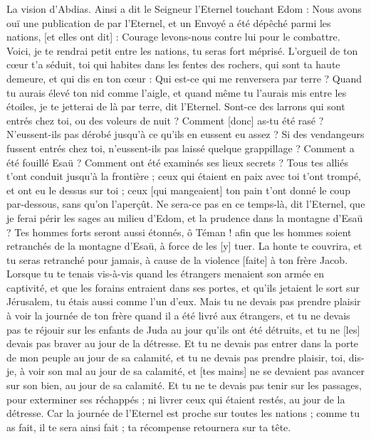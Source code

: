 \BFont
\begin{multicols}{2}
\VerseOne{}La vision d'Abdias. Ainsi a dit le Seigneur l'Eternel touchant Edom : Nous avons ouï une publication de par l'Eternel, et un Envoyé a été dépêché parmi les nations, [et elles ont dit] : Courage levons-nous contre lui pour le combattre.
Voici, je te rendrai petit entre les nations, tu seras fort méprisé.
L'orgueil de ton cœur t'a séduit, toi qui habites dans les fentes des rochers, qui sont ta haute demeure, et qui dis en ton cœur : Qui est-ce qui me renversera par terre ?
Quand tu aurais élevé ton nid comme l'aigle, et quand même tu l'aurais mis entre les étoiles, je te jetterai de là par terre, dit l'Eternel.
Sont-ce des larrons qui sont entrés chez toi, ou des voleurs de nuit ? Comment [donc] as-tu été rasé ? N'eussent-ils pas dérobé jusqu'à ce qu'ils en eussent eu assez ? Si des vendangeurs fussent entrés chez toi, n'eussent-ils pas laissé quelque grappillage ?
Comment a été fouillé Esaü ? Comment ont été examinés ses lieux secrets ?
Tous tes alliés t'ont conduit jusqu'à la frontière ; ceux qui étaient en paix avec toi t'ont trompé, et ont eu le dessus sur toi ; ceux [qui mangeaient] ton pain t'ont donné le coup par-dessous, sans qu'on l'aperçût.
Ne sera-ce pas en ce temps-là, dit l'Eternel, que je ferai périr les sages au milieu d'Edom, et la prudence dans la montagne d'Esaü ?
Tes hommes forts seront aussi étonnés, ô Téman ! afin que les hommes soient retranchés de la montagne d'Esaü, à force de les [y] tuer.
La honte te couvrira, et tu seras retranché pour jamais, à cause de la violence [faite] à ton frère Jacob.
Lorsque tu te tenais vis-à-vis quand les étrangers menaient son armée en captivité, et que les forains entraient dans ses portes, et qu'ils jetaient le sort sur Jérusalem, tu étais aussi comme l'un d'eux.
Mais tu ne devais pas prendre plaisir à voir la journée de ton frère quand il a été livré aux étrangers, et tu ne devais pas te réjouir sur les enfants de Juda au jour qu'ils ont été détruits, et tu ne [les] devais pas braver au jour de la détresse.
Et tu ne devais pas entrer dans la porte de mon peuple au jour de sa calamité, et tu ne devais pas prendre plaisir, toi, dis-je, à voir son mal au jour de sa calamité, et [tes mains] ne se devaient pas avancer sur son bien, au jour de sa calamité.
Et tu ne te devais pas tenir sur les passages, pour exterminer ses réchappés ; ni livrer ceux qui étaient restés, au jour de la détresse.
Car la journée de l'Eternel est proche sur toutes les nations ; comme tu as fait, il te sera ainsi fait ; ta récompense retournera sur ta tête.

\end{multicols}
